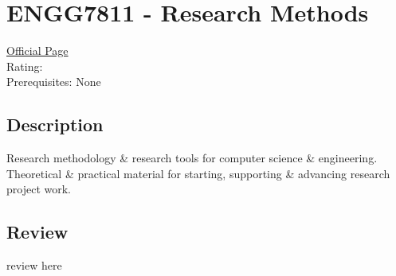 \hypertarget{ENGG7811}{\section{ENGG7811 - Research Methods}}

\large
\textcolor{turbo_purple}{\href{https://my.uq.edu.au/programs-courses/course.html?course_code=ENGG7811}{Official Page}} \\
Rating: \cstar\cstar\cstar\cstar\ostar \\
Prerequisites: None

\normalsize
\subsection*{Description}
Research methodology \& research tools for computer science \& engineering.
Theoretical \& practical material for starting, supporting \& advancing research project work.

\subsection*{Review}
review here
